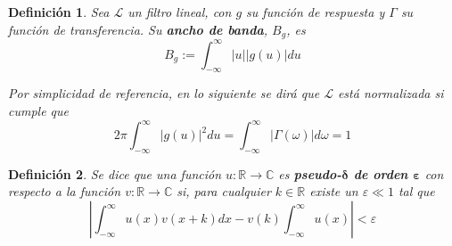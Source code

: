 \documentclass[12pt,letterpaper]{book}
\newtheorem{definicion}{Definición}[chapter]
\newcommand{\R}{\mathbb{R}}
\newcommand{\C}{\mathbb{C}}
\newcommand{\intR}{\int_{-\infty}^{\infty}}
\newcommand{\abso}[1]{\left| #1 \right|}
\begin{document}
\begin{definicion}
Sea $\mathcal{L}$ un filtro lineal, con $g$ su función de respuesta y $\Gamma$ su función de transferencia. Su \textbf{ancho de banda}, $B_g$, es
\begin{equation}
B_g := \intR \abso{u} \abso{g(u)} du
\end{equation}

Por simplicidad de referencia, en lo siguiente se dirá que $\mathcal{L}$ está normalizada si cumple que
\begin{equation}
2 \pi \intR \abso{g(u)}^{2} du = \intR \abso{\Gamma(\omega)} d\omega = 1
\label{s6:norm_g}
\end{equation}
\end{definicion}

\begin{definicion}
Se dice que una función $u : \R \rightarrow \C$ es \textbf{pseudo-$\boldsymbol{\delta}$ de orden $\boldsymbol{\varepsilon}$} con respecto a la función $v : \R \rightarrow \C$ si, para cualquier $k\in \R$ existe un $\varepsilon \ll 1$ tal que 
\begin{equation}
\abso{\intR u(x) v(x+k) dx  -  v(k)\intR u(x)} < \varepsilon
\end{equation}
\end{definicion}
\end{document}
